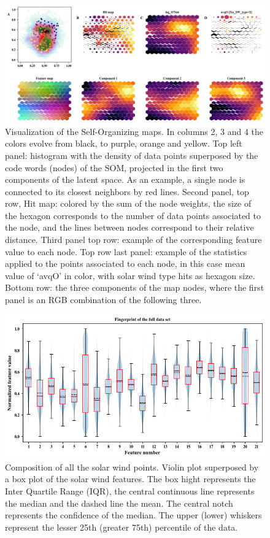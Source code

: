 \documentclass[utf8]{frontiersSCNS} %
\begin{document}
\begin{figure}[h!]
	\begin{center}
		\includegraphics[width=16cm]{Amaya/maps}%
	\end{center}
	\caption{Visualization of the Self-Organizing maps. In columns 2, 3 and 4 the colors evolve from black, to purple, orange and yellow. Top left panel: histogram with the density of data points superposed by the code words (nodes) of the SOM, projected in the first two components of the latent space. As an example, a single node is connected to its closest neighbors by red lines. Second panel, top row, Hit map: colored by the sum of the node weights, the size of the hexagon corresponds to the number of data points associated to the node, and the lines between nodes correspond to their relative distance. Third panel top row: example of the corresponding feature value to each node. Top row last panel: example of the statistics applied to the points associated to each node, in this case mean value of `avqO' in color, with solar wind type hits as hexagon size. Bottom row: the three components of the map nodes, where the first panel is an RGB combination of the following three.}\label{fig:maps}
\end{figure}

\begin{figure}[h!]
	\begin{center}
		\includegraphics[width=14cm]{Amaya/datarange}%
	\end{center}
	\caption{Composition of all the solar wind points. Violin plot superposed by a box plot of the solar wind features. The box hight represents the Inter Quartile Range (IQR), the central continuous line represents the median and the dashed line the mean. The central notch represents the confidence of the median. The upper (lower) whiskers represent the lesser 25th (greater 75th) percentile of the data. }\label{fig:datarange}
\end{figure}
\end{document}

